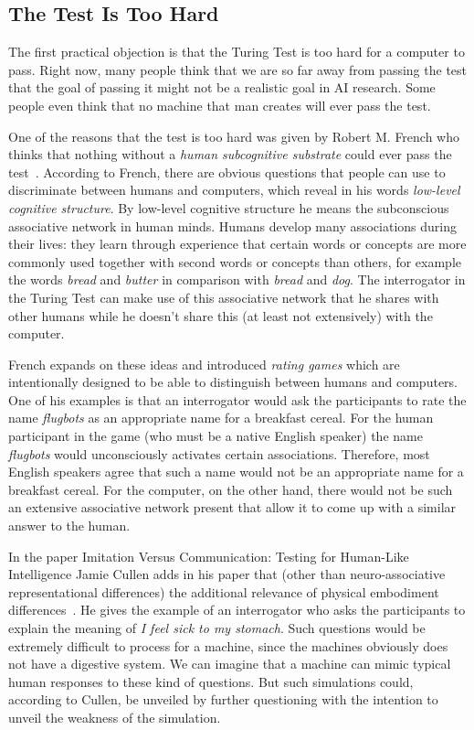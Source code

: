 \subsection{The Test Is Too Hard}
The first practical objection is that the Turing Test is too hard for a computer to pass. Right now, many people think that we are so far away from passing the test that the goal of passing it might not be a realistic goal in AI research. Some people even think that no machine that man creates will ever pass the test.

One of the reasons that the test is too hard was given by Robert M. French who thinks that nothing without a \textit{human subcognitive substrate} could ever pass the test~\cite{french1996subcognition}. According to French, there are obvious questions that people can use to discriminate between humans and computers, which reveal in his words \textit{low-level cognitive structure}. By low-level cognitive structure he means the subconscious associative network in human minds. Humans develop many associations during their lives: they learn through experience that certain words or concepts are more commonly used together with second words or concepts than others, for example the words \textit{bread} and \textit{butter} in comparison with \textit{bread} and \textit{dog}. The interrogator in the Turing Test can make use of this associative network that he shares with other humans while he doesn't share this (at least not extensively) with the computer.

French expands on these ideas and introduced \textit{rating games} which are intentionally designed to be able to distinguish between humans and computers. One of his examples is that an interrogator would ask the participants to rate the name \textit{flugbots} as an appropriate name for a breakfast cereal. For the human participant in the game (who must be a native English speaker) the name \textit{flugbots} would unconsciously activates certain associations. Therefore, most English speakers agree that such a name would not be an appropriate name for a breakfast cereal. For the computer, on the other hand, there would not be such an extensive associative network present that allow it to come up with a similar answer to the human.

In the paper Imitation Versus Communication: Testing for Human-Like Intelligence Jamie Cullen adds in his paper that (other than neuro-associative representational differences) the additional relevance of physical embodiment differences~\cite{cullen2009imitation}. He gives the example of an interrogator who asks the participants to explain the meaning of \textit{I feel sick to my stomach}. Such questions would be extremely difficult to process for a machine, since the machines obviously does not have a digestive system. We can imagine that a machine can mimic typical human responses to these kind of questions. But such simulations could, according to Cullen, be unveiled by further questioning with the intention to unveil the weakness of the simulation.

